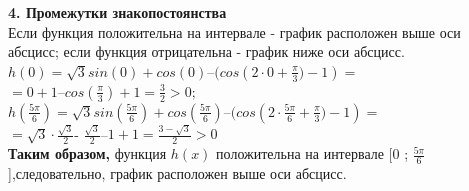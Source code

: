 \documentclass[russian,utf8,nocolumnxxxi,nocolumnxxxii]{eskdtext}
\begin{document}
      \textbf{4. Промежутки знакопостоянства}\\
     Если функция положительна на интервале - график расположен выше оси абсцисс; если функция отрицательна - график ниже оси абсцисс. \\[10pt]
     $h{(0)} =\sqrt{3}sin(0) + cos(0)$–$(cos(2\cdot{0} + {\frac{\pi}{3})-1})=$\\
     $={0}+{1}$–$cos({\frac{\pi}{3}})+1={\frac{3}{2}}> 0;$\\
     $h{({\frac{5\pi}{6}})} =\sqrt{3}sin({\frac{5\pi}{6}}) + cos({\frac{5\pi}{6}})$–$(cos(2\cdot{{\frac{5\pi}{6}}} + {\frac{\pi}{3})-1})=$\\
     $=\sqrt{3}\cdot{\frac{\sqrt{3}}{2}}$- ${\frac{\sqrt{3}}{2}}$–$1+1={\frac{3-{\sqrt{3}}}{2}}> 0$\\[10pt]
     \textbf{Таким образом,} функция ${h(x)}$ положительна на интервале [0 ; $\frac{5{\pi}}{6}$],следовательно, график расположен выше оси абсцисс.\\
     
\end{document}
